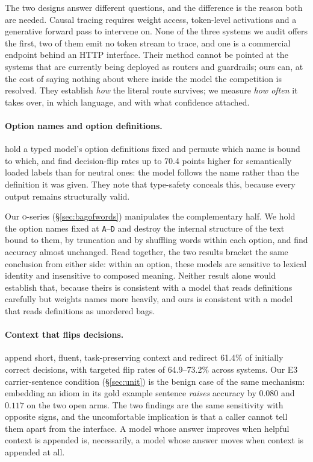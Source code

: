 \documentclass[11pt]{article}
\begin{document}
The two designs answer different questions, and the difference is the reason
both are needed. Causal tracing requires weight access, token-level activations
and a generative forward pass to intervene on. None of the three systems we
audit offers the first, two of them emit no token stream to trace, and one is a
commercial endpoint behind an HTTP interface. Their method cannot be pointed at
the systems that are currently being deployed as routers and guardrails; ours
can, at the cost of saying nothing about where inside the model the competition
is resolved. They establish \emph{how} the literal route survives; we measure
\emph{how often} it takes over, in which language, and with what confidence
attached.

\paragraph{Option names and option definitions.} \citet{sun2026typesafe} hold a
typed model's option definitions fixed and permute which name is bound to which,
and find decision-flip rates up to 70.4 points higher for semantically loaded
labels than for neutral ones: the model follows the name rather than the
definition it was given. They note that type-safety conceals this, because every
output remains structurally valid.

Our \textsc{o}-series (\S\ref{sec:bagofwords}) manipulates the complementary
half. We hold the option names fixed at \texttt{A}--\texttt{D} and destroy the
internal structure of the text bound to them, by truncation and by shuffling
words within each option, and find accuracy almost unchanged. Read together, the
two results bracket the same conclusion from either side: within an option,
these models are sensitive to lexical identity and insensitive to composed
meaning. Neither result alone would establish that, because theirs is consistent
with a model that reads definitions carefully but weights names more heavily,
and ours is consistent with a model that reads definitions as unordered bags.

\paragraph{Context that flips decisions.} \citet{xu2026jevout} append short,
fluent, task-preserving context and redirect 61.4\% of initially correct
decisions, with targeted flip rates of 64.9--73.2\% across systems. Our E3
carrier-sentence condition (\S\ref{sec:unit}) is the benign case of the same
mechanism: embedding an idiom in its gold example sentence \emph{raises}
accuracy by $0.080$ and $0.117$ on the two open arms. The two findings are the
same sensitivity with opposite signs, and the uncomfortable implication is that
a caller cannot tell them apart from the interface. A model whose answer
improves when helpful context is appended is, necessarily, a model whose answer
moves when context is appended at all.
\end{document}
